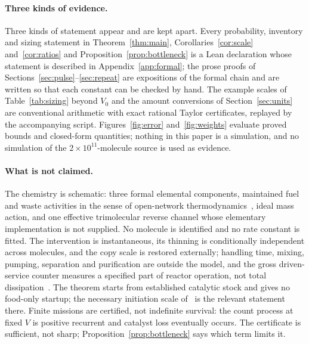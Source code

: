 \documentclass[11pt,a4paper]{article}
\theoremstyle{plain}
\theoremstyle{definition}
\theoremstyle{remark}
\begin{document}
\paragraph{Three kinds of evidence.}
Three kinds of statement appear and are kept apart. Every probability, inventory and sizing statement in Theorem~\ref{thm:main}, Corollaries~\ref{cor:scale} and~\ref{cor:ratios} and Proposition~\ref{prop:bottleneck} is a Lean declaration whose statement is described in Appendix~\ref{app:formal}; the prose proofs of Sections~\ref{sec:pulse}--\ref{sec:repeat} are expositions of the formal chain and are written so that each constant can be checked by hand. The example scales of Table~\ref{tab:sizing} beyond $V_0$ and the amount conversions of Section~\ref{sec:units} are conventional arithmetic with exact rational Taylor certificates, replayed by the accompanying script. Figures~\ref{fig:error} and~\ref{fig:weights} evaluate proved bounds and closed-form quantities; nothing in this paper is a simulation, and no simulation of the $2\times10^{11}$-molecule source is used as evidence.

\paragraph{What is not claimed.}
The chemistry is schematic: three formal elemental components, maintained fuel and waste activities in the sense of open-network thermodynamics~\citep{polettini2014,rao2016}, ideal mass action, and one effective trimolecular reverse channel whose elementary implementation is not supplied. No molecule is identified and no rate constant is fitted. The intervention is instantaneous, its thinning is conditionally independent across molecules, and the copy scale is restored externally; handling time, mixing, pumping, separation and purification are outside the model, and the gross driven-service counter measures a specified part of reactor operation, not total dissipation~\citep{rao2018}. The theorem starts from established catalytic stock and gives no food-only startup; the necessary initiation scale of~\citep{thermo2026} is the relevant statement there. Finite missions are certified, not indefinite survival: the count process at fixed $V$ is positive recurrent and catalyst loss eventually occurs. The certificate is sufficient, not sharp; Proposition~\ref{prop:bottleneck} says which term limits it.
\end{document}

